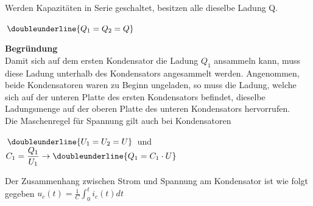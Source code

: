 \newpage
	\beginip
		Werden Kapazitäten in Serie geschaltet, besitzen alle dieselbe Ladung Q.
		\begin{center}
			\fix
				 $\displaystyle \doubleunderline{Q_1 = Q_2 = Q}$
		\end{center}
	\iend

	\textbf{Begründung} \\
		Damit sich auf dem ersten Kondensator die Ladung $Q_1$ ansammeln kann, muss diese Ladung unterhalb des Kondensators angesammelt werden. Angenommen, beide Kondensatoren waren zu Beginn ungeladen,
		so muss die Ladung, welche sich auf der unteren Platte des ersten Kondensators befindet, dieselbe Ladungsmenge auf der oberen Platte des unteren Kondensators hervorrufen. \\

		\beginip
			Die Maschenregel für Spannung gilt auch bei Kondensatoren
			\begin{center}
				\fix
					$\displaystyle \doubleunderline{U_1 = U_2 = U} $  und  $\displaystyle C_1 = \frac{Q_1}{U_1} \rightarrow \doubleunderline{Q_1 = C_1 \cdot U}$
			\end{center}
		\iend


		\beginip
		Der Zusammenhang zwischen Strom und Spannung am Kondensator ist wie folgt gegeben
		\formulaBegin
		$\displaystyle u_c(t) = \frac{1}{C} \int_0^t i_c(t) dt$ \\

